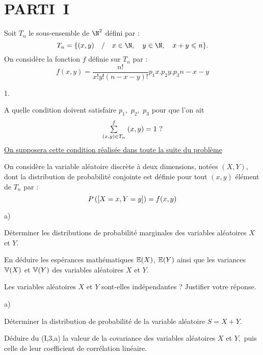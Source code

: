 \documentclass[11pt]{article}%
\begin{document}
\section*{PARTI\E\ I}

Soit $T_{n}$ le sous-ensemble de $\N^{2}$ défini par :
\[
T_{n} = \{(x,y)\quad /\quad x\in \N,\quad y\in \N,\quad
x + y\leq n\}.
\]
On considère la fonction $f$ définie sur $T_{n}$ par :
\[
f(x,y) = \dfrac{n!}{x!y!(n-x-y)!}p_{1}{x}.p_{2}{y}.p_{3}{n-x-y}
\]

\begin{noliste}{1.}
 \setlength{\itemsep}{4mm}
\item A quelle condition doivent satisfaire $p_{1},$ $p_{2},$ $p_{3}$
pour
que l'on ait 
\[
{\textstyle\sum\limits_{(x,y)\in T_{n}}^{f}}\hspace{.1cm}(x,y) = 1\text{ ?}
\]
\underline{On supposera cette condition réalisée dans toute la suite du
problème}

\item On considère la variable aléatoire discrète à deux dimensions,
notées $(X,Y)$, dont la distribution de probabilité conjointe est
définie pour tout $(x,y)$ élément de $T_{n}$ par :
\[
P\left(\left[ {X = x,Y = y} \right]\right) = f(x,y)
\]

\begin{noliste}{a)}
 \setlength{\itemsep}{2mm}
\item Déterminer les distributions de probabilité marginales des
variables aléatoires $X$ et $Y.$

\item En déduire les espérances mathématiques $\mathbb{E}(X)$, $\mathbb{E}(Y)$ ainsi
que les
variances $\mathbb{V}(X)$ et $\mathbb{V}(Y)$ des variables aléatoires $X$ et $Y.$

\item Les variables aléatoires $X$ et $Y$ sont-elles indépendantes ?
Justifier votre réponse.
\end{noliste}

\item 

\begin{noliste}{a)}
 \setlength{\itemsep}{2mm}
\item Déterminer la distribution de probabilité de la variable
aléatoire $S = X + Y.$

\item Déduire du (I,3,a) la valeur de la covariance des variables
aléatoires 
$X$ et $Y,$ puis celle de leur coefficient de corrélation linéaire.
\end{noliste}
\end{noliste}
\end{document}
